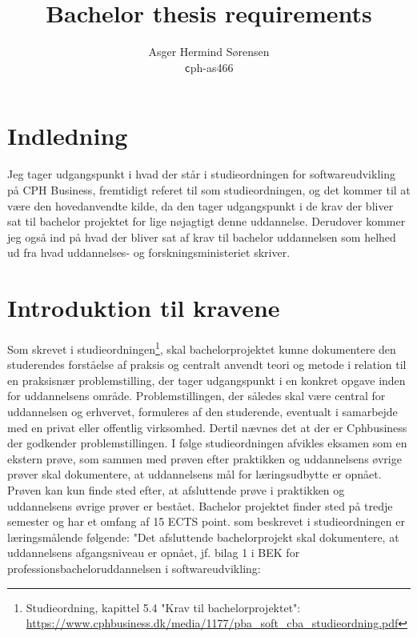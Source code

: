 \documentclass{report}
\title{Bachelor thesis requirements}
\author{
    Asger Hermind Sørensen\\
    \texttt cph-as466
}
\date{}
\begin{document}
\maketitle
\newpage


\tableofcontents
\newpage
\section{Indledning}
Jeg tager udgangspunkt i hvad der står i studieordningen for softwareudvikling på CPH Business,
fremtidigt referet til som studieordningen, og det kommer til at være den hovedanvendte kilde,
da den tager udgangspunkt i de krav der bliver sat til bachelor projektet for lige nøjagtigt 
denne uddannelse. Derudover kommer jeg også ind på hvad der bliver sat af krav til bachelor uddannelsen
som helhed ud fra hvad uddannelses- og forskningsministeriet skriver. 

\section{Introduktion til kravene}
Som skrevet i studieordningen\footnote{Studieordning, kapittel 5.4 "Krav til bachelorprojektet": \url{https://www.cphbusiness.dk/media/1177/pba_soft_cba_studieordning.pdf}}, 
skal bachelorprojektet kunne dokumentere den studerendes forståelse af praksis og centralt
anvendt teori og metode i relation til en praksisnær problemstilling, der tager udgangspunkt i en konkret 
opgave inden for uddannelsens område. Problemstillingen, der således skal være central for 
uddannelsen og erhvervet, formuleres af den studerende, eventualt i samarbejde med en privat eller offentlig virksomhed.
Dertil nævnes det at der er Cphbusiness der godkender problemstillingen. I følge studieordningen afvikles 
eksamen som en ekstern prøve, som sammen med prøven efter praktikken og uddannelsens øvrige prøver skal dokumentere, 
at uddannelsens mål for læringsudbytte er opnået. Prøven kan kun finde sted efter, at afsluttende prøve i 
praktikken og uddannelsens øvrige prøver er bestået.
Bachelor projektet finder sted på tredje semester og har et omfang af 15 ECTS point.
som beskrevet i studieordningen er læringsmålende følgende:
"Det afsluttende bachelorprojekt skal dokumentere, at uddannelsens
afgangsniveau er opnået, jf. bilag 1 i BEK for professionsbacheloruddannelsen i
softwareudvikling:\\
\end{document}
